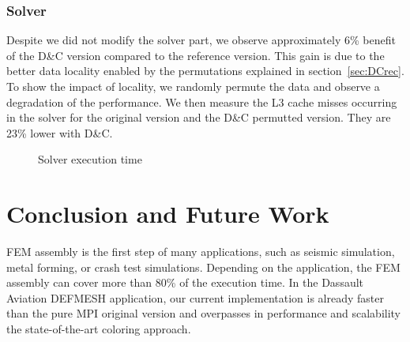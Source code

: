 \documentclass{IOS-Book-Article}
\begin{document}
\subsubsection{Solver}
Despite we did not modify the solver part, we observe approximately 6\% benefit of the D\&C version compared to the reference version.
This gain is due to the better data locality enabled by the permutations explained in section~\ref{sec:DCrec}. To show the impact of locality, we randomly permute the data and observe a degradation of the performance. We then measure the L3 cache misses occurring in the solver for the original version and the D\&C permutted version. They are 23\% lower with D\&C.

\begin{figure}[htp]
 \centering
 \caption{Solver execution time}
 \label{fig:solCurves}
\end{figure}

\section{Conclusion and Future Work}
FEM assembly is the first step of many applications, such as seismic simulation, metal forming, or crash test simulations. Depending on the application, the FEM assembly can cover more than 80\% of the execution time.
In the Dassault Aviation DEFMESH application, our current implementation is already faster than the pure MPI original version and overpasses in performance and scalability the state-of-the-art coloring approach.
\end{document}
